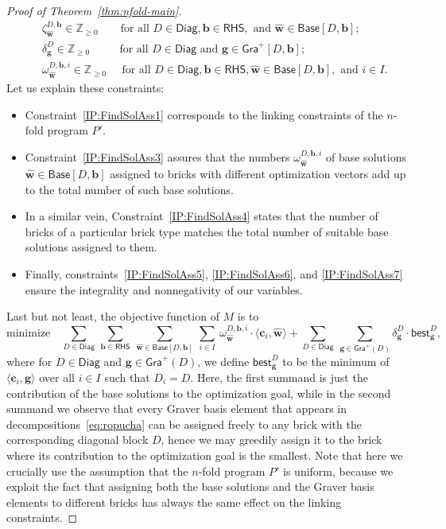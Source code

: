 \documentclass{article}
\renewcommand{\geq}{\geqslant}
\newcommand{\Z}{\mathbb{Z}}
\newcommand{\Zn}{\Z_{\geq 0}}
\newcommand{\tup}[1]{{\mathbf{#1}}}
\newcommand{\ww}{\tup w}
\newcommand{\whww}{{\widehat{\ww}}}
\newcommand{\bb}{\tup b}
\renewcommand{\gg}{\tup g}
\newcommand{\cc}{\tup c}
\newcommand{\RHS}{\mathsf{RHS}}
\newcommand{\Diag}{\mathsf{Diag}}
\newcommand{\Base}{\mathsf{Base}}
\newcommand{\Gra}{\mathsf{Gra}^+}
\newcommand{\rev}{\mathsf{best}}
\newcommand{\sca}[2]{\langle #1,#2\rangle}
\begin{document}
\begin{proof}[Proof of Theorem~\ref{thm:nfold-main}]
\begin{align*}
&\quad\ \ \zeta^{D,\bb}_{\whww} \in \Zn \qquad \textrm{for all }D\in \Diag, \bb\in \RHS, \textrm{ and } \whww\in \Base[D,\bb]; &
\tag{C4} \label{IP:FindSolAss5}\\
& \quad\ \ \delta^D_\gg \in \Zn\qquad\ \ \   \textrm{for all }D\in \Diag \textrm{ and } \gg\in \Gra[D,\bb]; &
\tag{C5} \label{IP:FindSolAss6}\\
& \quad\ \ \omega^{D,\bb,i}_{\whww} \in \Zn \quad\ \,\textrm{for all }D\in \Diag, \bb\in \RHS, \whww\in \Base[D,\bb], \textrm{ and } i\in I. &
\tag{C6} \label{IP:FindSolAss7}
\end{align*}
Let us explain these constraints:
\begin{itemize}[nosep]
\item Constraint~\cref{IP:FindSolAss1} corresponds to the linking constraints of the $n$-fold program $P'$.
\item  Constraint~\cref{IP:FindSolAss3} assures that the numbers $\omega^{D,\bb,i}_{\whww}$ of base solutions $\whww\in \Base[D,\bb]$ assigned to bricks with different optimization vectors add up to the total number of such base solutions.
\item In a similar vein, Constraint~\cref{IP:FindSolAss4} states that
 the number of bricks of a particular brick type matches the total number of suitable base solutions assigned to them.
\item Finally, constraints~\cref{IP:FindSolAss5}, \cref{IP:FindSolAss6}, and \cref{IP:FindSolAss7} ensure the integrality and nonnegativity of our variables.
\end{itemize}
Last but not least, the objective function of $M$ is to
\begin{equation*}
\text{minimize}\quad \sum_{D\in \Diag}\ \sum_{\bb\in \RHS}\ \sum_{\whww\in \Base[D,\bb]}\ \sum_{i\in I}\ \omega^{D,\bb,i}_{\whww}\cdot \sca{\cc_i}{\whww} +\sum_{D\in \Diag}\ \sum_{\gg\in \Gra(D)}  \delta^D_\gg\cdot  \rev^{D}_\gg,
\end{equation*}
where for $D\in \Diag$ and $\gg\in \Gra(D)$, we define $\rev^D_\gg$ to be the minimum of $\sca{\cc_i}{\gg}$ over all $i\in I$ such that $D_i=D$. Here, the first summand is just the contribution of the base solutions to the optimization goal, while in the second summand we observe that every Graver basis element that appears in decompositions~\cref{eq:ropucha} can be assigned freely to any brick with the corresponding diagonal block $D$, hence we may greedily assign it to the brick where its contribution to the optimization goal is the smallest. Note that here we crucially use the assumption that the $n$-fold program $P'$ is uniform, because we exploit the fact that assigning both the base solutions and the Graver basis elements to different bricks has always the same effect on the linking constraints.


\end{proof}
\end{document}
